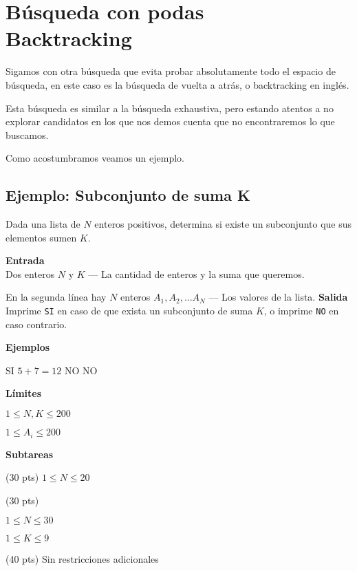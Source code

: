 \chapter[Búsqueda con podas]{Búsqueda con podas\\ Backtracking}

Sigamos con otra búsqueda que evita probar absolutamente todo el espacio de búsqueda, en este caso es la búsqueda de vuelta a atrás, o backtracking en inglés.

Esta búsqueda es similar a la búsqueda exhaustiva, pero estando atentos a no explorar candidatos en los que nos demos cuenta que no encontraremos lo que buscamos.

Como acostumbramos veamos un ejemplo.

\section*{Ejemplo: Subconjunto de suma K}

Dada una lista de \(N\) enteros positivos, determina si existe un subconjunto que sus elementos sumen \(K\).

\textbf{Entrada}\\
Dos enteros \(N\) y \(K\) --- La cantidad de enteros y la suma que queremos.

En la segunda línea hay \(N\) enteros \(A_1, A_2, \ldots A_N\) --- Los valores de la lista.
\textbf{Salida}\\
Imprime \verb|SI| en caso de que exista un subconjunto de suma \(K\), o imprime \verb|NO| en caso contrario.

\textbf{Ejemplos}\\
\begin{casebox3}
	 {
	SI
	}
	{
		\(5+7=12\)
	}
	 {
		NO
	}
	{
	}
	 {
	NO
	}
	{	
	}
\end{casebox3}

\textbf{Límites}
\begin{plimits}
	\item \(1\leq N,K \leq 200\)
	\item \(1\leq A_i \leq 200\)
\end{plimits}
	
\textbf{Subtareas}
\begin{plimits}
	\item (30 pts) \(1\leq N \leq 20\)
	\item (30 pts)
	\begin{plimits}
		\item \(1\leq N \leq 30\)
		\item \(1\leq K \leq 9\)		
	\end{plimits}
	\item (40 pts) Sin restricciones adicionales
\end{plimits}

